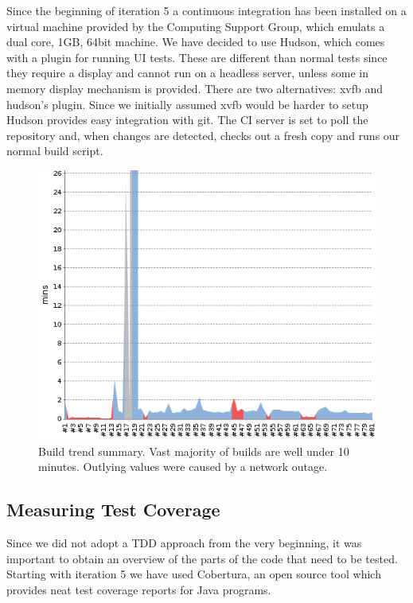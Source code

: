 \documentclass[10pt]{article}
\begin{document}
Since the beginning of iteration 5 a continuous integration has been installed on a virtual machine provided by the Computing Support Group, which emulats a dual core, 1GB, 64bit machine.
We have decided to use Hudson, which comes with a plugin for running UI tests. These are different than normal tests since they require a display and cannot run on a headless server, unless some in memory display mechanism is provided. There are two alternatives: xvfb and hudson's plugin. Since we initially assumed xvfb would be harder to setup
Hudson provides easy integration with git.
The CI server is set to poll the repository and, when changes are detected, checks out a fresh copy and runs our normal build script.

\begin{figure}[ht]
\centering
\includegraphics[bb=0 0 500 400, scale = 0.6]{build-trend.png}
\caption{Build trend summary. Vast majority of builds are well under 10 minutes. Outlying values were caused by a network outage.}
\end{figure}

\subsection{Measuring Test Coverage}

Since we did not adopt a TDD approach from the very beginning, it was important to obtain an overview of the parts of the code that need to be tested. Starting with iteration 5 we have used Cobertura,  an open source tool which provides neat test coverage reports for Java programs.
\end{document}
